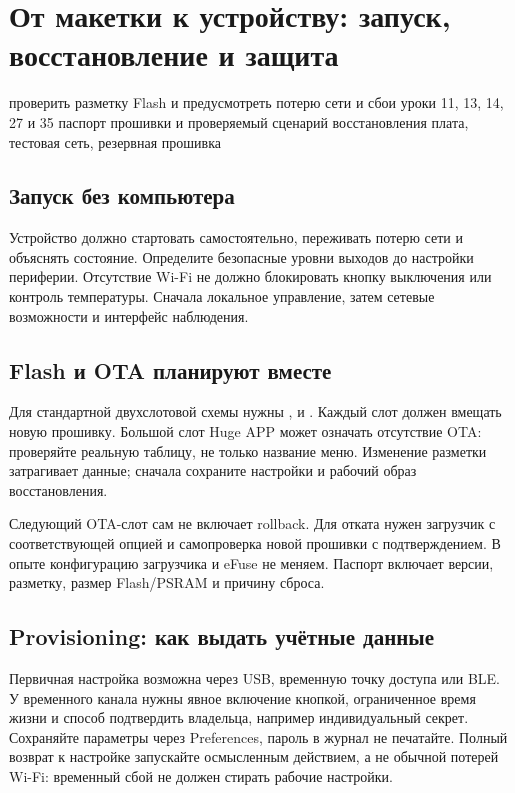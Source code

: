 \section{От макетки к устройству: запуск, восстановление и защита}\label{les:reliability}
\lessonintro
  {проверить разметку Flash и предусмотреть потерю сети и сбои}
  {уроки 11, 13, 14, 27 и 35}
  {паспорт прошивки и проверяемый сценарий восстановления}
  {плата, тестовая сеть, резервная прошивка}

\subsection{Запуск без компьютера}
Устройство должно стартовать самостоятельно, переживать потерю сети и объяснять состояние.
Определите безопасные уровни выходов до настройки периферии. Отсутствие Wi-Fi не должно
блокировать кнопку выключения или контроль температуры. Сначала локальное управление,
затем сетевые возможности и интерфейс наблюдения.

\subsection{Flash и OTA планируют вместе}
Для стандартной двухслотовой схемы нужны ,  и .
Каждый слот должен вмещать новую прошивку. Большой слот Huge APP может означать отсутствие OTA:
проверяйте реальную таблицу, не только название меню. Изменение разметки затрагивает данные;
сначала сохраните настройки и рабочий образ восстановления.


Следующий OTA-слот сам не включает rollback. Для отката нужен загрузчик с соответствующей
опцией и самопроверка новой прошивки с подтверждением. В опыте конфигурацию загрузчика
и eFuse не меняем. Паспорт включает версии, разметку, размер Flash/PSRAM и причину сброса.

\subsection{Provisioning: как выдать учётные данные}
Первичная настройка возможна через USB, временную точку доступа или BLE.
У временного канала нужны явное включение кнопкой, ограниченное время жизни и способ
подтвердить владельца, например индивидуальный секрет. Сохраняйте параметры через Preferences,
пароль в журнал не печатайте. Полный возврат к настройке запускайте осмысленным действием,
а не обычной потерей Wi-Fi: временный сбой не должен стирать рабочие настройки.


